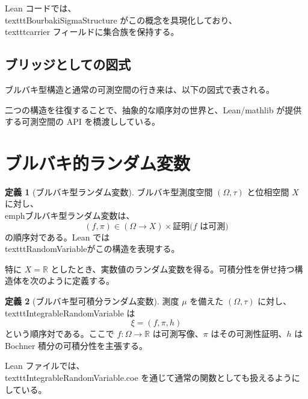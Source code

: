 \documentclass[12pt]{ltjsarticle}
\theoremstyle{definition}
\newtheorem{definition}{定義}[section]
\theoremstyle{plain}
\begin{document}
Lean コードでは、\\texttt{BourbakiSigmaStructure} がこの概念を具現化しており、\\texttt{carrier} フィールドに集合族を保持する。

\subsection{ブリッジとしての図式}
ブルバキ型構造と通常の可測空間の行き来は、以下の図式で表される。
\begin{center}
\end{center}
二つの構造を往復することで、抽象的な順序対の世界と、Lean/mathlib が提供する可測空間の API を橋渡ししている。

\section{ブルバキ的ランダム変数}
\begin{definition}[ブルバキ型ランダム変数]
ブルバキ型測度空間 $(\Omega,\tau)$ と位相空間 $X$ に対し、\\emph{ブルバキ型ランダム変数}は、\
\[
  (f, \pi) \in (\Omega \to X) \times \text{証明}\bigl(f \text{ は可測}\bigr)
\]
の順序対である。Lean では\\texttt{RandomVariable}がこの構造を表現する。
\end{definition}

特に $X = \mathbb{R}$ としたとき、実数値のランダム変数を得る。可積分性を併せ持つ構造体を次のように定義する。

\begin{definition}[ブルバキ型可積分ランダム変数]
測度 $\mu$ を備えた $(\Omega,\tau)$ に対し、\\texttt{IntegrableRandomVariable} は
\[
  \xi = (f, \pi, h)
\]
という順序対である。ここで $f: \Omega \to \mathbb{R}$ は可測写像、$\pi$ はその可測性証明、$h$ は Bochner 積分の可積分性を主張する。
\end{definition}

Lean ファイルでは、\\texttt{IntegrableRandomVariable.coe} を通じて通常の関数としても扱えるようにしている。
\end{document}
